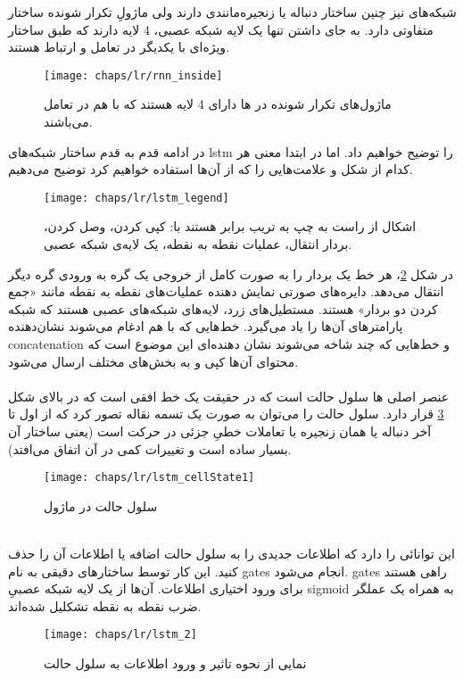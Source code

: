 شبکه‌های  نیز چنین ساختار دنباله یا زنجیره‌مانندی دارند ولی ماژولِ تکرار شونده ساختار متفاوتی دارد. به جای داشتن تنها یک لایه شبکه عصبی، 4 لایه دارند که طبق ساختار ویژه‌ای با یکدیگر در تعامل و ارتباط هستند.
\begin{figure}[!ht]
	\centerline{\texttt{[image: chaps/lr/rnn\_inside]}}
	\caption{
		ماژول‌های تکرار شونده در ها دارای 4 لایه هستند که با هم در تعامل می‌باشند.
	}
	\label{fig:ch_lr:rnn_inside}
\end{figure} 
در ادامه قدم به قدم ساختار شبکه‌های \gls{lstm} را توضیح خواهیم داد. اما در ابتدا معنی هر کدام از شکل‌ و علامت‌هایی را که از آن‌ها استفاده خواهیم کرد توضیح می‌دهیم.
\begin{figure}[!ht]
	\centerline{\texttt{[image: chaps/lr/lstm\_legend]}}
	\caption{
		اشکال از راست به چپ به تریب برابر هستند با: کپی کردن، وصل کردن، بردار انتقال، عملیات نقطه به نقطه، یک لایه‌ی شبکه عصبی.
	}
	\label{fig:ch_lr:lstm_legend}
\end{figure} 
در شکل \ref{fig:ch_lr:lstm_legend}، هر خط یک بردار را به صورت کامل از خروجی یک گره به ورودی گره دیگر انتقال می‌دهد. دایره‌های صورتی نمایش دهنده عملیات‌های نقطه‌ به نقطه مانند «جمع کردن دو بردار» هستند. مستطیل‌های زرد، لایه‌‌های شبکه‌های عصبی هستند که شبکه پارامتر‌های آن‌ها را یاد می‌گیرد. خط‌هایی که با هم ادغام می‌شوند نشان‌دهنده \gls{concatenation} و خط‌هایی که چند شاخه می‌شوند نشان دهنده‌ای این موضوع است که محتوای آن‌ها کپی و به بخش‌های مختلف ارسال می‌شود.
\\
\\
عنصر اصلی ها سلول حالت است که در حقیقت یک خط افقی است که در بالای شکل \ref{fig:ch_lr:lstm_cellState1} قرار دارد.
سلول حالت را می‌توان به صورت یک تسمه نقاله تصور کرد که از اول تا آخر دنباله یا همان زنجیره با تعاملات خطیِ جزئی در حرکت است (یعنی ساختار آن بسیار ساده است و تغییرات کمی در آن اتفاق می‌افتد).
\begin{figure}[!ht]
	\centerline{\texttt{[image: chaps/lr/lstm\_cellState1]}}
	\caption{
		سلول حالت در ماژول 
	}
	\label{fig:ch_lr:lstm_cellState1}
\end{figure} 
\\
این توانائی را دارد که اطلاعات جدیدی را به سلول حالت اضافه یا اطلاعات آن را حذف کنید. این کار توسط ساختارهای دقیقی به نام \glspl{gate} انجام می‌شود. \glspl{gate}‌ راهی هستند برای ورود اختیاری اطلاعات. آن‌ها از یک لایه شبکه عصبیِ \gls{sigmoid} به همراه یک عملگر ضرب نقطه به نقطه تشکلیل شده‌اند.
\begin{figure}[!ht]
	\centerline{\texttt{[image: chaps/lr/lstm\_2]}}
	\caption{
		نمایی از نحوه تاثیر و ورود اطلاعات به سلول حالت
	}
	\label{fig:ch_lr:lstm_2}
\end{figure} 
